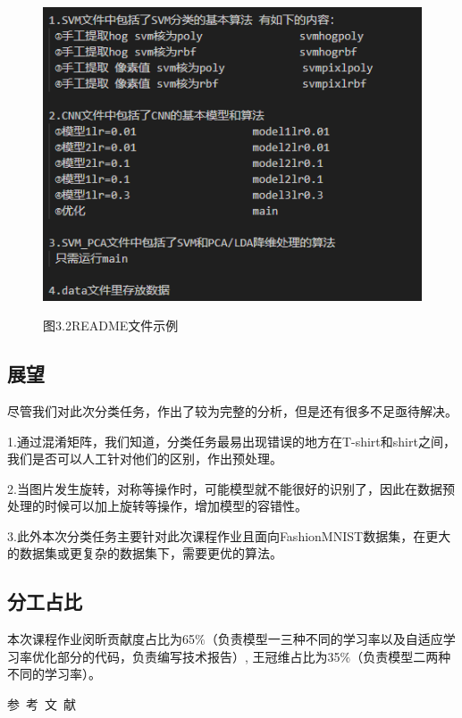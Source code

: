 \documentclass[10.5pt,compsoc,UTF8]{CjC}
\theoremstyle{mystyle}
\begin{document}
\begin{figure}[htbp]
\centering

\centerline{\includegraphics[width=0.5\linewidth]{github2.png}}
\heiti 图3.2\quad  README文件示例
\end{figure}


\subsection{展望}
尽管我们对此次分类任务，作出了较为完整的分析，但是还有很多不足亟待解决。

  1.通过混淆矩阵，我们知道，分类任务最易出现错误的地方在T-shirt和shirt之间，我们是否可以人工针对他们的区别，作出预处理。

  2.当图片发生旋转，对称等操作时，可能模型就不能很好的识别了，因此在数据预处理的时候可以加上旋转等操作，增加模型的容错性。

  3.此外本次分类任务主要针对此次课程作业且面向FashionMNIST数据集，在更大的数据集或更复杂的数据集下，需要更优的算法。

\subsection{分工占比}
本次课程作业闵昕贡献度占比为65$\%$（负责模型一三种不同的学习率以及自适应学习率优化部分的代码，负责编写技术报告）,
王冠维占比为35$\%$（负责模型二两种不同的学习率）。




\vspace {10mm}

\vspace {10mm}
\centerline
{\textsf{参~考~文~献}}
 \addtolength{\itemsep}{-1em}
\vspace {1.5mm}


\end{document}
